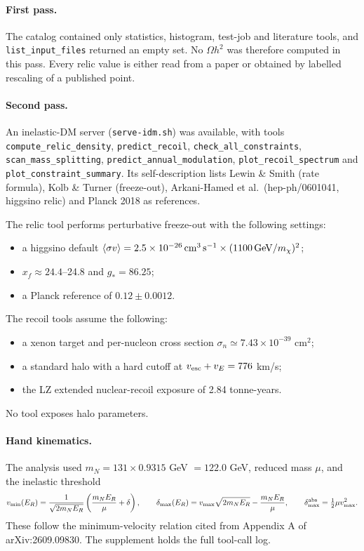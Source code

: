 \documentclass[11pt,a4paper]{article}
\begin{document}
\paragraph{First pass.} The catalog contained only statistics, histogram, test-job and literature tools, and \texttt{list\_input\_files} returned an empty set. No $\Omega h^2$ was therefore computed in this pass. Every relic value is either read from a paper or obtained by labelled rescaling of a published point.

\paragraph{Second pass.} An inelastic-DM server (\texttt{serve-idm.sh}) was available, with tools \texttt{compute\_relic\_density}, \texttt{predict\_recoil}, \texttt{check\_all\_constraints}, \texttt{scan\_mass\_splitting}, \texttt{predict\_annual\_modulation}, \texttt{plot\_recoil\_spectrum} and \texttt{plot\_constraint\_summary}. Its self-description lists Lewin \& Smith (rate formula), Kolb \& Turner (freeze-out), Arkani-Hamed et al.\ (hep-ph/0601041, higgsino relic) and Planck 2018 as references.

The relic tool performs perturbative freeze-out with the following settings:
\begin{itemize}
\item a higgsino default $\langle\sigma v\rangle = 2.5\times10^{-26}\,{\rm cm^3\,s^{-1}}\times(1100\,{\rm GeV}/m_\chi)^2$;
\item $x_f\approx24.4$--24.8 and $g_*=86.25$;
\item a Planck reference of $0.12\pm0.0012$.
\end{itemize}

The recoil tools assume the following:
\begin{itemize}
\item a xenon target and per-nucleon cross section $\sigma_n\simeq7.43\times10^{-39}$ cm$^2$;
\item a standard halo with a hard cutoff at $v_{\rm esc}+v_E=776$ km/s;
\item the LZ extended nuclear-recoil exposure of 2.84 tonne-years.
\end{itemize}
No tool exposes halo parameters.

\paragraph{Hand kinematics.} The analysis used $m_N=131\times0.9315$ GeV $=122.0$ GeV, reduced mass $\mu$, and the inelastic threshold
\begin{equation}
v_{\min}(E_R)=\frac{1}{\sqrt{2m_NE_R}}\left(\frac{m_NE_R}{\mu}+\delta\right),\qquad
\delta_{\max}(E_R)=v_{\max}\sqrt{2m_NE_R}-\frac{m_NE_R}{\mu},\qquad
\delta_{\max}^{\rm abs}=\tfrac12\mu v_{\max}^2 .
\end{equation}
These follow the minimum-velocity relation cited from Appendix A of arXiv:2609.09830. The supplement holds the full tool-call log.
\end{document}
